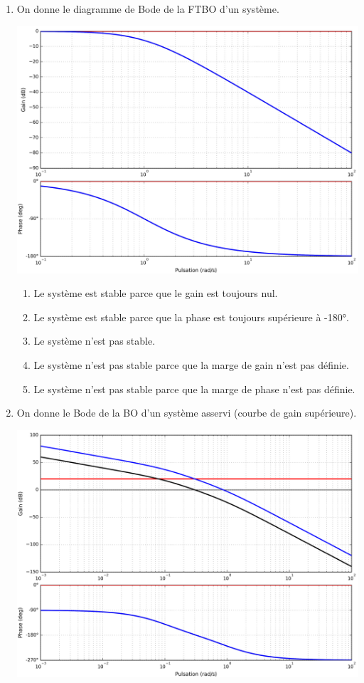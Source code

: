 \documentclass[10pt,fleqn]{article} %
\begin{document}
\begin{multicols}{2}
\begin{enumerate}
\begin{enumerate}
système d'ordre 2 est toujours stable.
\item Le système est stable parce que c'est comme ça et puis c'est tout.
\item On ne peut pas savoir sur ce tracé.
\end{enumerate}
\item On donne le diagramme de Bode de la FTBO d'un système.
\begin{center}
\includegraphics[width=\linewidth]{images/Bode_01}
\end{center}
\begin{enumerate}
\item Le système est stable parce que le gain est toujours nul.
\item Le système est stable parce que la phase est toujours supérieure à
-180°.
\item Le système n'est pas stable.
\item Le système n'est pas stable parce que la marge de gain n'est pas
définie.
\item Le système n'est pas stable parce que la marge de phase n'est pas définie.
\end{enumerate}
\item On donne le Bode de la BO d'un système asservi (courbe de gain supérieure).
\begin{center}
\includegraphics[width=\linewidth]{images/Bode_02}

\end{center}
\end{enumerate}
\end{multicols}
\end{document}
